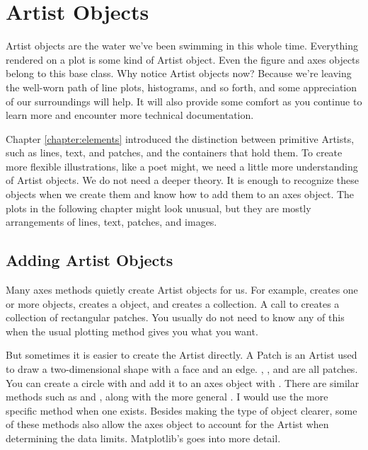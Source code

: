 \chapter{Artist Objects}\label{chapter:artists}

Artist objects are the water we've been swimming in this whole time. Everything rendered on a plot is some kind of Artist object. Even the figure and axes objects belong to this base class. Why notice Artist objects now? Because we're leaving the well-worn path of line plots, histograms, and so forth, and some appreciation of our surroundings will help. It will also provide some comfort as you continue to learn more and encounter more technical documentation.

Chapter \ref{chapter:elements} introduced the distinction between primitive Artists, such as lines, text, and patches, and the containers that hold them. To create more flexible illustrations, like a poet might, we need a little more understanding of Artist objects. We do not need a deeper theory. It is enough to recognize these objects when we create them and know how to add them to an axes object. The plots in the following chapter might look unusual, but they are mostly arrangements of lines, text, patches, and images.

\section{Adding Artist Objects}

Many axes methods quietly create Artist objects for us. For example,  creates one or more  objects,  creates a  object, and  creates a collection. A call to  creates a collection of rectangular patches. You usually do not need to know any of this when the usual plotting method gives you what you want.

But sometimes it is easier to create the Artist directly. A Patch is an Artist used to draw a two-dimensional shape with a face and an edge. , , and  are all patches. You can create a circle with  and add it to an axes object with . There are similar methods such as  and , along with the more general . I would use the more specific method when one exists. Besides making the type of object clearer, some of these methods also allow the axes object to account for the Artist when determining the data limits. Matplotlib's  goes into more detail.

